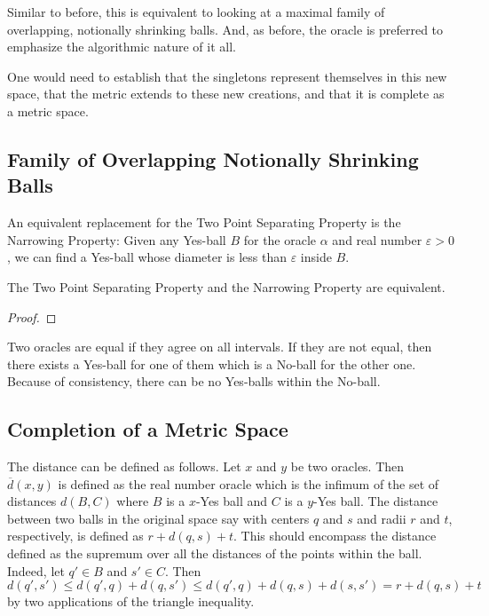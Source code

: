\documentclass[12pt]{article}
\begin{document}
Similar to before, this is equivalent to looking at a maximal family of overlapping, notionally shrinking balls. And, as before, the oracle is preferred to emphasize the algorithmic nature of it all. 

One would need to establish that the singletons represent themselves in this new space, that the metric extends to these new creations, and that it is complete as a metric space.



\subsection{Family of Overlapping Notionally Shrinking Balls}

An equivalent replacement for the Two Point Separating Property is the Narrowing Property: Given any Yes-ball $B$ for the oracle $\alpha$ and real number $\varepsilon >0$, we can find a Yes-ball whose diameter is less than $\varepsilon$ inside $B$.

\begin{proposition}
    The Two Point Separating Property and the Narrowing Property are equivalent.
\end{proposition}

\begin{proof}
    
\end{proof}


Two oracles are equal if they agree on all intervals. If they are not equal, then there exists a Yes-ball for one of them which is a No-ball for the other one. Because of consistency, there can be no Yes-balls within the No-ball. 


\subsection{Completion of a Metric Space}



The distance can be defined as follows. Let $x$ and $y$ be two oracles. Then $\overline{d}(x,y)$ is defined as the real number oracle which is the infimum of the set of distances $d(B, C)$ where $B$ is a $x$-Yes ball and $C$ is a $y$-Yes ball. The distance between two balls in the original space say with centers $q$ and $s$ and radii $r$ and $t$, respectively, is defined as $r + d(q,s) + t$. This should encompass the distance defined as the supremum over all the distances of the points within the ball. Indeed, let $q' \in B$ and $s'\in C$. Then $d(q', s') \leq d(q',q) + d(q,s') \leq d(q',q) + d(q,s) + d(s,s') = r + d(q,s) + t$ by two applications of the triangle inequality.  
\end{document}
